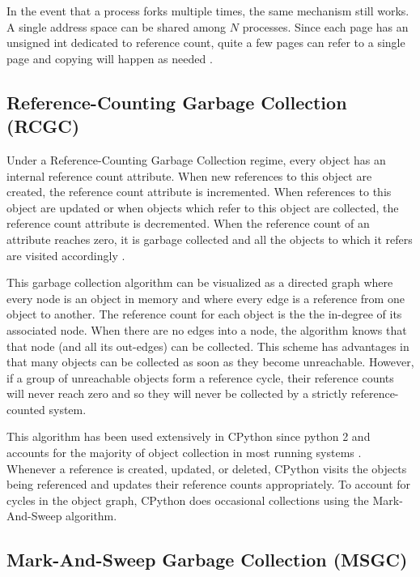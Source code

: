 \documentclass{article}
\begin{document}
In the event that a process forks multiple times, the same mechanism still works.  A single address space can be shared among $N$ processes.  Since each page has an unsigned int dedicated to reference count, quite a few pages can refer to a single page and copying will happen as needed \cite{kernelsource,VMM}.  

\subsection{Reference-Counting Garbage Collection (RCGC)}\label{sec:RCGC}

Under a Reference-Counting Garbage Collection regime, every object has an internal reference count attribute.  When new references to this object are created, the reference count attribute is incremented.  When references to this object are updated or when objects which refer to this object are collected, the reference count attribute is decremented.  When the reference count of an attribute reaches zero, it is garbage collected and all the objects to which it refers are visited accordingly \cite{GC-continuum}.  

This garbage collection algorithm can be visualized as a directed graph where every node is an object in memory and where every edge is a reference from one object to another.  The reference count for each object is the the in-degree of its associated node.  When there are no edges into a node, the algorithm knows that that node (and all its out-edges) can be collected.  This scheme has advantages in that many objects can be collected as soon as they become unreachable.  However, if a group of unreachable objects form a reference cycle, their reference counts will never reach zero and so they will never be collected by a strictly reference-counted system.  

This algorithm has been used extensively in CPython since python 2 and accounts for the majority of object collection in most running systems \cite{cpython3-doc}.  Whenever a reference is created, updated, or deleted, CPython visits the objects being referenced and updates their reference counts appropriately.  To account for cycles in the object graph, CPython does occasional collections using the Mark-And-Sweep algorithm.  

\subsection{Mark-And-Sweep Garbage Collection (MSGC)}\label{sec:MSGC}
\end{document}
